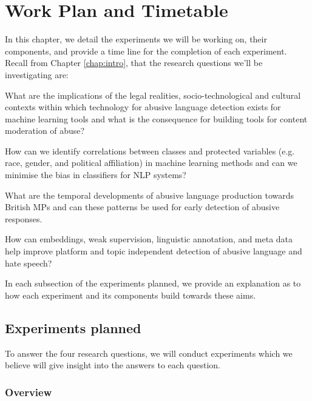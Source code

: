 \ifpdf
    \graphicspath{{Chapter5/Figs/Raster/}{Chapter5/Figs/PDF/}{Chapter5/Figs/}}
\else
    \graphicspath{{Chapter5/Figs/Vector/}{Chapter5/Figs/}}
\fi

\chapter{Work Plan and Timetable}\label{chap:experiments}

In this chapter, we detail the experiments we will be working on, their components, and provide a time line for the completion of each experiment. Recall from Chapter \autoref{chap:intro}, that the research questions we'll be investigating are:

\begin{questions}
  \item{What are the implications of the legal realities, socio-technological and cultural contexts within which technology for abusive language detection exists for machine learning tools and what is the consequence for building tools for content moderation of abuse?}
  \item{How can we identify correlations between classes and protected variables (e.g. race, gender, and political affiliation) in machine learning methods and can we minimise the bias in classifiers for NLP systems?}
  \item{What are the temporal developments of abusive language production towards British MPs and can these patterns be used for early detection of abusive responses.}
  \item{How can embeddings, weak supervision, linguistic annotation, and meta data help improve platform and topic independent detection of abusive language and hate speech?}
\end{questions}

In each subsection of the experiments planned, we provide an explanation as to how each experiment and its components build towards these aims.

\section{Experiments planned}\label{sec:experiments}

To answer the four research questions, we will conduct experiments which we believe will give insight into the answers to each question. 

\subsection{Overview}\label{sub:overview}

